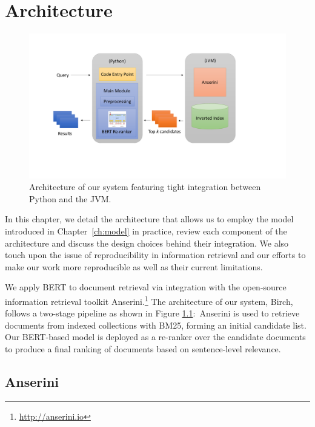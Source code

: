 \chapter{Architecture}
\label{ch:arch}

\begin{figure}[b!]
\centering
  \includegraphics[width=5in]{figures/architecture.pdf}
\caption{Architecture of our system featuring tight integration between Python and the JVM.}
\label{fig:arch}
\end{figure}

In this chapter, we detail the architecture that allows us to employ the model introduced in Chapter~\ref{ch:model} in practice, review each component of the architecture and discuss the design choices behind their integration.
We also touch upon the issue of reproducibility in information retrieval and our efforts to make our work more reproducible as well as their current limitations.

We apply BERT to document retrieval via integration with the open-source information retrieval toolkit Anserini.\footnote{\url{http://anserini.io}}
The architecture of our system, Birch, follows a two-stage pipeline as shown in Figure \ref{fig:arch}:\
Anserini is used to retrieve documents from indexed collections with BM25, forming an initial candidate list.
Our BERT-based model is deployed as a re-ranker over the candidate documents to produce a final ranking of documents based on sentence-level relevance.

\section{Anserini}

